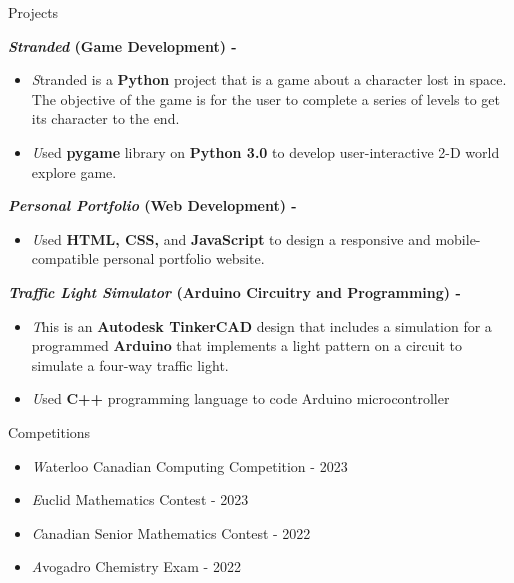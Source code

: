 \documentclass[
	10pt, %
]{resume} %
\begin{document}
\begin{rSection}{Projects}

	\textbf{\textit{Stranded} (Game Development) - }
    \begin{itemize}
            \item \textit Stranded is a \textbf{Python} project that is a game about a character lost in space. The objective of the game is for the user to complete a series of levels to get its character to the end.
            \item \textit Used \textbf{pygame} library on \textbf{Python 3.0} to develop user-interactive 2-D world explore game.
        \end{itemize}

    \textbf{\textit{Personal Portfolio} (Web Development) - }
    \begin{itemize}
            \item \textit Used \textbf{HTML, CSS, }and \textbf{JavaScript} to design a responsive and mobile-compatible personal portfolio website.
        \end{itemize}

    \textbf{\textit{Traffic Light Simulator} (Arduino Circuitry and Programming) - }
    \begin{itemize}
            \item \textit This is an \textbf{Autodesk TinkerCAD} design that includes a simulation for a programmed \textbf{Arduino} that implements a light pattern on a circuit to simulate a four-way traffic light. 
            \item \textit Used \textbf{C++} programming language to code Arduino microcontroller
        \end{itemize}
        
\end{rSection}

\begin{rSection}{Competitions}
	\begin{itemize}
            \item \textit Waterloo Canadian Computing Competition - 2023
            \item \textit Euclid Mathematics Contest - 2023
            \item \textit Canadian Senior Mathematics Contest - 2022
            \item \textit Avogadro Chemistry Exam - 2022
        \end{itemize}
    
\end{rSection}
\end{document}
